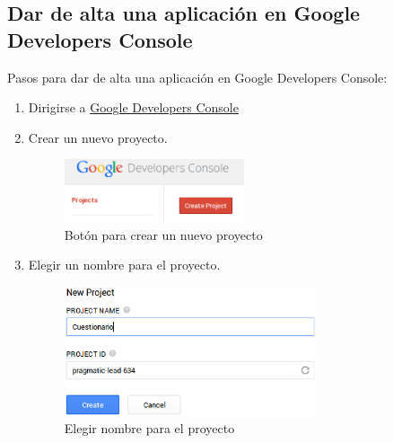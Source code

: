 \subsection{Dar de alta una aplicaci\'on en Google Developers Console}
\label{subsec:Apendice2.13}

Pasos para dar de alta una aplicaci\'on en Google Developers Console:
\begin{enumerate}
  \item Dirigirse a \href{https://console.developers.google.com/}{Google Developers Console}
  
  \item Crear un nuevo proyecto.
  \begin{figure}[H]
  \begin{center}
  \includegraphics[width=0.5\textwidth]{images/gdc0.eps}
  \caption{Bot\'on para crear un nuevo proyecto}
  \label{fig:gdc0}
  \end{center}
  \end{figure}
  
  \item Elegir un nombre para el proyecto.
  \begin{figure}[!th]
  \begin{center}
  \includegraphics[width=0.7\textwidth]{images/gdc1.eps}
  \caption{Elegir nombre para el proyecto}
  \label{fig:gdc1}
  \end{center}
  \end{figure}
  \newpage
  

\end{enumerate}
